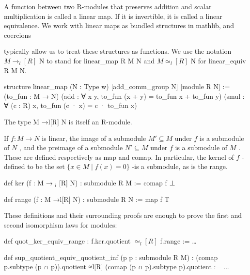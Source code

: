 \documentclass[
]{article}
\newenvironment{Shaded}{}{}
\newcommand{\NormalTok}[1]{#1}
\begin{document}
A function between two R-modules that preserves addition and scalar
multiplication is called a linear map. If it is invertible, it is called
a linear equivalence. We work with linear maps as bundled structures in
mathlib, and coercions

typically allow us to treat these structures as functions. We use the
notation \(M \rightarrow_{l}[R]\) N to stand for linear\_map R M N and
\(M \simeq_{l}[R]\) N for linear\_equiv R M N.

\begin{Shaded}
\begin{Highlighting}[]
\NormalTok{structure linear\_map (N : Type w)}
\NormalTok{[add\_comm\_group N] [module R N] :=}
\NormalTok{(to\_fun : M → N)}
\NormalTok{(add : ∀ x y,}
\NormalTok{    to\_fun (x + y) = to\_fun x + to\_fun y)}
\NormalTok{(smul : ∀ (c : R) x,}
\NormalTok{    to\_fun (c · x) = c · to\_fun x) }
\end{Highlighting}
\end{Shaded}

The type M →l{[}R{]} N is itself an R-module.

If \(f: M \to N\) is linear, the image of a submodule \(M' \subseteq M\)
under \(f\) is a submodule of \(N\) , and the preimage of a submodule
\(N' \subseteq M\) under \(f\) is a submodule of \(M\) . These are
defined respectively as map and comap. In particular, the kernel of
\(f\) -defined to be the set \(\{x \in M \mid f(x) = 0\}\) -is a
submodule, as is the range.

def ker (f : M → \(_{l}\) {[}R{]} N) : submodule R M := comap f ⊥

\begin{Shaded}
\begin{Highlighting}[]
\NormalTok{def range (f : M →l[R] N) : submodule R N := map f T }
\end{Highlighting}
\end{Shaded}

These definitions and their surrounding proofs are enough to prove the
first and second isomorphism laws for modules:

def quot\_ker\_equiv\_range : f.ker.quotient \(\simeq_{l}[R]\) f.range
:= \ldots{}

\begin{Shaded}
\begin{Highlighting}[]
\NormalTok{def sup\_quotient\_equiv\_quotient\_inf}
\NormalTok{(p p\textquotesingle{} : submodule R M) :}
\NormalTok{(comap p.subtype (p ∩ p\textquotesingle{})).quotient ≈l[R]}
\NormalTok{(comap (p ∩ p\textquotesingle{}).subtype p\textquotesingle{}).quotient := ... }
\end{Highlighting}
\end{Shaded}
\end{document}
